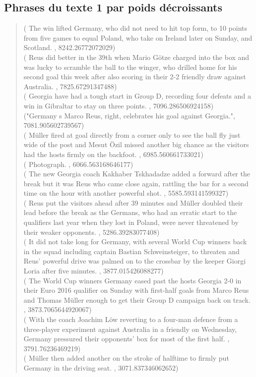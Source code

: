 \documentclass[a4paper, 12pt]{article}
\begin{document}
\subsection{Phrases du texte 1 par poids décroissants}

\begin{quotation}
 ( The win lifted Germany,  who did not need to hit top form,  to 10 points from five games to equal Poland,  who take on Ireland later on Sunday,  and Scotland. , 8242.26772072029)\\
( Reus did better in the 39th when Mario Götze charged into the box and was lucky to scramble the ball to the winger,  who drilled home for his second goal this week after also scoring in their 2-2 friendly draw against Australia. , 7825.67291347488)\\
( Georgia have had a tough start in Group D,  recording four defeats and a win in Gibraltar to stay on three points. , 7096.286506924158)\\
("Germany s Marco Reus,  right,  celebrates his goal against Georgia.", 7081.905602739567)\\
( Müller fired at goal directly from a corner only to see the ball fly just wide of the post and Mesut Özil missed another big chance as the visitors had the hosts firmly on the backfoot. , 6985.560661733021)\\
( Photograph. , 6066.563168646177)\\
( The new Georgia coach Kakhaber Tskhadadze added a forward after the break but it was Reus who came close again,  rattling the bar for a second time on the hour with another powerful shot. , 5585.593141599327)\\
( Reus put the visitors ahead after 39 minutes and Müller doubled their lead before the break as the Germans,  who had an erratic start to the qualifiers last year when they lost in Poland,  were never threatened by their weaker opponents. , 5286.39283077408)\\
( It did not take long for Germany,  with several World Cup winners back in the squad including captain Bastian Schweinsteiger,  to threaten and Reus’ powerful drive was palmed on to the crossbar by the keeper Giorgi Loria after five minutes. , 3877.015426088277)\\
( The World Cup winners Germany eased past the hosts Georgia 2-0 in their Euro 2016 qualifier on Sunday with first-half goals from Marco Reus and Thomas Müller enough to get their Group D campaign back on track. , 3873.7065644920067)\\
( With the coach Joachim Löw reverting to a four-man defence from a three-player experiment against Australia in a friendly on Wednesday,  Germany pressured their opponents’ box for most of the first half. , 3791.76236469219)\\
( Müller then added another on the stroke of halftime to firmly put Germany in the driving seat. , 3071.837346062652)\\
\end{quotation}
\end{document}
